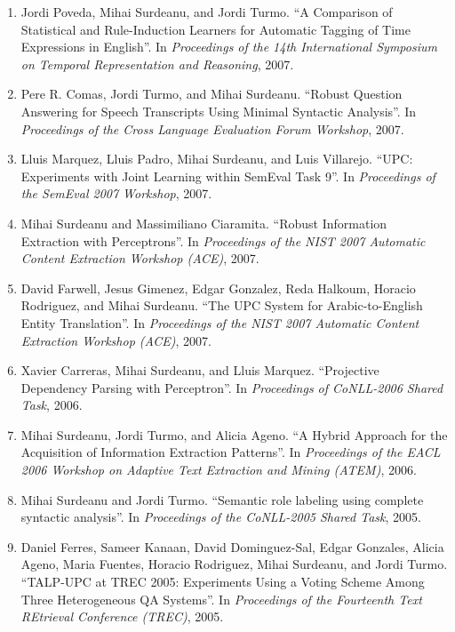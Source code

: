 \documentclass[10pt]{article}
\newcommand{\ve}[1]{{\em #1}} %
\newcommand{\ti}[1]{``#1''} %
\begin{document}
\begin{description}
\begin{enumerate}
\item
Jordi Poveda, Mihai Surdeanu, and Jordi Turmo.  \ti{A Comparison of Statistical and Rule-Induction Learners for Automatic Tagging of Time Expressions in English}.  In \ve{Proceedings of the 14th International Symposium on Temporal Representation and Reasoning}, 2007.

\item
Pere R. Comas, Jordi Turmo, and Mihai Surdeanu.  \ti{Robust Question Answering for Speech Transcripts Using Minimal Syntactic Analysis}.  In \ve{Proceedings of the Cross Language Evaluation Forum Workshop}, 2007.

\item
Lluis Marquez, Lluis Padro, Mihai Surdeanu, and Luis Villarejo.  \ti{UPC: Experiments with Joint Learning within SemEval Task 9}.  In \ve{Proceedings of the SemEval 2007 Workshop}, 2007.

\item
Mihai Surdeanu and Massimiliano Ciaramita.  \ti{Robust Information Extraction with Perceptrons}.  In \ve{Proceedings of the NIST 2007 Automatic Content Extraction Workshop (ACE)}, 2007.

\item
David Farwell, Jesus Gimenez, Edgar Gonzalez, Reda Halkoum, Horacio Rodriguez, and Mihai Surdeanu.  \ti{The UPC System for Arabic-to-English Entity Translation}.  In \ve{Proceedings of the NIST 2007 Automatic Content Extraction Workshop (ACE)}, 2007. 

\item
Xavier Carreras, Mihai Surdeanu, and Lluis Marquez.  \ti{Projective Dependency Parsing with Perceptron}.  In \ve{Proceedings of CoNLL-2006 Shared Task}, 2006.

\item
Mihai Surdeanu, Jordi Turmo, and Alicia Ageno.  \ti{A Hybrid Approach for the Acquisition of Information Extraction Patterns}.  In \ve{Proceedings of the EACL 2006 Workshop on Adaptive Text Extraction and Mining (ATEM)}, 2006.

\item
Mihai Surdeanu and Jordi Turmo.  \ti{Semantic role labeling using complete syntactic analysis}.  In \ve{Proceedings of the CoNLL-2005 Shared Task}, 2005. 

\item
Daniel Ferres, Sameer Kanaan, David Dominguez-Sal, Edgar Gonzales, Alicia Ageno, Maria Fuentes, Horacio Rodriguez, Mihai Surdeanu, and Jordi Turmo.  \ti{TALP-UPC at TREC 2005: Experiments Using a Voting Scheme Among Three Heterogeneous QA Systems}.  In \ve{Proceedings of the Fourteenth Text REtrieval Conference (TREC)}, 2005.


\end{enumerate}
\end{description}
\end{document}
